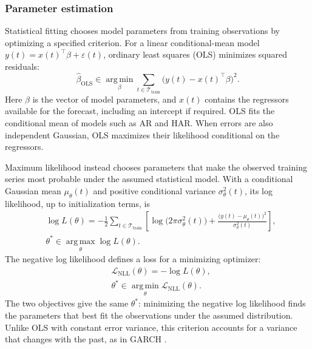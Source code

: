 \documentclass[12pt,a4paper]{article}
\numberwithin{equation}{section}
\numberwithin{table}{section}
\numberwithin{figure}{section}
\begin{document}
\subsubsection{Parameter estimation}
Statistical fitting chooses model parameters from training observations by optimizing a specified criterion. For a linear conditional-mean model $y(t)=x(t)^\top\beta+\varepsilon(t)$, ordinary least squares (OLS) minimizes squared residuals:
\begin{equation}\label{eq:ols-estimation}
\widehat\beta_{\mathrm{OLS}}\in\operatorname*{arg\,min}_{\beta}
\sum_{t\in\mathcal T_{\mathrm{train}}}\bigl(y(t)-x(t)^\top\beta\bigr)^2.
\end{equation}
Here $\beta$ is the vector of model parameters, and $x(t)$ contains the regressors available for the forecast, including an intercept if required. OLS fits the conditional mean of models such as AR and HAR. When errors are also independent Gaussian, OLS maximizes their likelihood conditional on the regressors.

Maximum likelihood instead chooses parameters that make the observed training series most probable under the assumed statistical model. With a conditional Gaussian mean $\mu_\theta(t)$ and positive conditional variance $\sigma_\theta^2(t)$, its log likelihood, up to initialization terms, is
\begin{equation}\label{eq:gaussian-loglikelihood}
\begin{aligned}
&\log L(\theta)=-\frac12\sum_{t\in\mathcal T_{\mathrm{train}}}
\left[\log\!\bigl(2\pi\sigma_\theta^2(t)\bigr)
+\frac{\bigl(y(t)-\mu_\theta(t)\bigr)^2}{\sigma_\theta^2(t)}\right],\\
&\theta^*\in\operatorname*{arg\,max}_{\theta}\log L(\theta).
\end{aligned}
\end{equation}
The negative log likelihood defines a loss for a minimizing optimizer:
\begin{equation}\label{eq:gaussian-nll}
\begin{aligned}
&\mathcal L_{\mathrm{NLL}}(\theta)=-\log L(\theta),\\
&\theta^*\in\operatorname*{arg\,min}_{\theta}\mathcal L_{\mathrm{NLL}}(\theta).
\end{aligned}
\end{equation}
The two objectives give the same $\theta^*$: minimizing the negative log likelihood finds the parameters that best fit the observations under the assumed distribution. Unlike OLS with constant error variance, this criterion accounts for a variance that changes with the past, as in GARCH \cite{bollerslev1986}.
\end{document}
